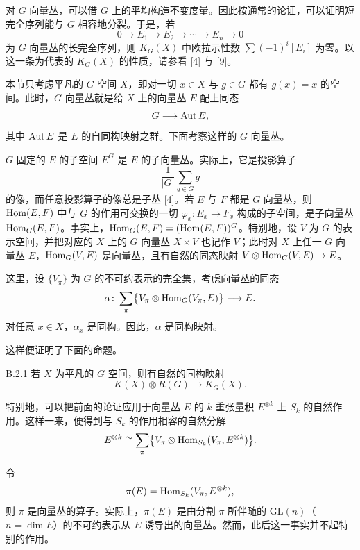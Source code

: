 对 $G$ 向量丛，可以借 $G$ 上的平均构造不变度量。因此按通常的论证，可以证明短完全序列能与 $G$ 相容地分裂。于是，若
\[
0\longrightarrow E_1\longrightarrow E_2\longrightarrow\cdots\longrightarrow E_n\longrightarrow 0
\]
为 $G$ 向量丛的长完全序列，则 $K_G(X)$ 中欧拉示性数 $\sum(-1)^i[E_i]$ 为零。以这一条为代表的 $K_G(X)$ 的性质，请参看 [4] 与 [9]。

本节只考虑平凡的 $G$ 空间 $X$，即对一切 $x\in X$ 与 $g\in G$ 都有 $g(x)=x$ 的空间。此时，$G$ 向量丛就是给 $X$ 上的向量丛 $E$ 配上同态
\[
G\longrightarrow\operatorname{Aut} E,
\]
其中 $\operatorname{Aut} E$ 是 $E$ 的自同构映射之群。下面考察这样的 $G$ 向量丛。


$G$ 固定的 $E$ 的子空间 $E^G$ 是 $E$ 的子向量丛。实际上，它是投影算子
\[
\frac{1}{|G|}\sum_{g\in G}g
\]
的像，而任意投影算子的像总是子丛 [4]。若 $E$ 与 $F$ 都是 $G$ 向量丛，则 $\operatorname{Hom}(E,F)$ 中与 $G$ 的作用可交换的一切 $\varphi_x\colon E_x\to F_x$ 构成的子空间，是子向量丛 $\operatorname{Hom}_G(E,F)$。事实上，$\operatorname{Hom}_G(E,F)=(\operatorname{Hom}(E,F))^G$。特别地，设 $V$ 为 $G$ 的表示空间，并把对应的 $X$ 上的 $G$ 向量丛 $X\times V$ 也记作 $V$；此时对 $X$ 上任一 $G$ 向量丛 $E$，$\operatorname{Hom}_G(V,E)$ 是向量丛，且有自然的同态映射 $V\otimes\operatorname{Hom}_G(V,E)\to E$。

这里，设 $\{V_\pi\}$ 为 $G$ 的不可约表示的完全集，考虑向量丛的同态
\[
\alpha\colon\sum_{\pi}\bigl\{V_\pi\otimes\operatorname{Hom}_G(V_\pi,E)\bigr\}\longrightarrow E.
\]
对任意 $x\in X$，$\alpha_x$ 是同构。因此，$\alpha$ 是同构映射。

这样便证明了下面的命题。

\begin{proposition*}{B.2.1}
  若 $X$ 为平凡的 $G$ 空间，则有自然的同构映射
  \[
  K(X)\otimes R(G)\longrightarrow K_G(X).
  \]
\end{proposition*}

特别地，可以把前面的论证应用于向量丛 $E$ 的 $k$ 重张量积 $E^{\otimes k}$ 上 $S_k$ 的自然作用。这样一来，便得到与 $S_k$ 的作用相容的自然分解
\[
E^{\otimes k}\cong\sum_{\pi}\bigl\{V_\pi\otimes\operatorname{Hom}_{S_k}(V_\pi,E^{\otimes k})\bigr\}.
\]

令
\[
\pi(E)=\operatorname{Hom}_{S_k}(V_\pi,E^{\otimes k}),
\]
则 $\pi$ 是向量丛的算子。实际上，$\pi(E)$ 是由分割 $\pi$ 所伴随的 $\mathrm{GL}(n)$（$n=\dim E$）的不可约表示从 $E$ 诱导出的向量丛。然而，此后这一事实并不起特别的作用。

